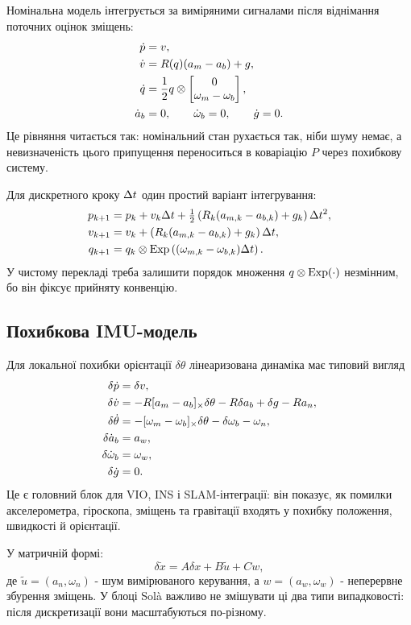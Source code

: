 Номінальна модель інтегрується за виміряними сигналами після віднімання поточних оцінок зміщень:
\begin{align}
 \dot p &= v, \\
 \dot v &= R(q)(a_m-a_b) + g, \\
 \dot q &= \frac12 q \otimes \begin{bmatrix}0\\ \omega_m-\omega_b\end{bmatrix}, \\
 \dot a_b &= 0, \qquad \dot\omega_b = 0, \qquad \dot g=0.
\end{align}
Це рівняння читається так: номінальний стан рухається так, ніби шуму немає, а невизначеність цього припущення переноситься в коваріацію $P$ через похибкову систему.

Для дискретного кроку $\Delta t$ один простий варіант інтегрування:
\begin{align}
 p_{k+1} &= p_k + v_k\Delta t + \tfrac12\left(R_k(a_{m,k}-a_{b,k})+g_k\right)\Delta t^2,\\
 v_{k+1} &= v_k + \left(R_k(a_{m,k}-a_{b,k})+g_k\right)\Delta t,\\
 q_{k+1} &= q_k \otimes \mathrm{Exp}\left((\omega_{m,k}-\omega_{b,k})\Delta t\right).
\end{align}
У чистому перекладі треба залишити порядок множення $q\otimes\mathrm{Exp}(\cdot)$ незмінним, бо він фіксує прийняту конвенцію.

\subsection{Похибкова IMU-модель}

Для локальної похибки орієнтації $\delta\theta$ лінеаризована динаміка має типовий вигляд
\begin{align}
 \delta\dot p &= \delta v,\\
 \delta\dot v &= -R[a_m-a_b]_{\times}\delta\theta - R\delta a_b + \delta g - R a_n,\\
 \delta\dot\theta &= -[\omega_m-\omega_b]_{\times}\delta\theta - \delta\omega_b - \omega_n,\\
 \delta\dot a_b &= a_w,\\
 \delta\dot\omega_b &= \omega_w,\\
 \delta\dot g &= 0.
\end{align}
Це є головний блок для VIO, INS і SLAM-інтеграції: він показує, як помилки акселерометра, гіроскопа, зміщень та гравітації входять у похибку положення, швидкості й орієнтації.

У матричній формі:
\begin{equation}
 \delta\dot x = A\delta x + B\tilde u + Cw,
\end{equation}
де $\tilde u=(a_n,\omega_n)$ - шум вимірюваного керування, а $w=(a_w,\omega_w)$ - неперервне збурення зміщень. У блоці Solà важливо не змішувати ці два типи випадковості: після дискретизації вони масштабуються по-різному.

